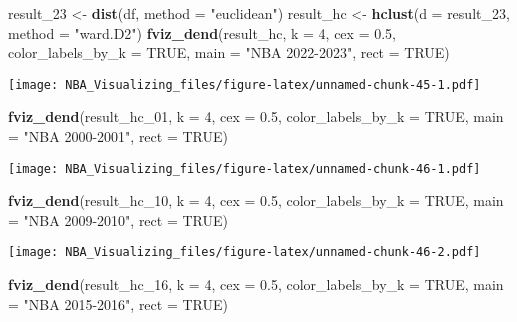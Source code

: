 \documentclass[
]{book}
\newenvironment{Shaded}{\begin{snugshade}}{\end{snugshade}}
\newcommand{\AttributeTok}[1]{\textcolor[rgb]{0.13,0.29,0.53}{#1}}
\newcommand{\ConstantTok}[1]{\textcolor[rgb]{0.56,0.35,0.01}{#1}}
\newcommand{\DecValTok}[1]{\textcolor[rgb]{0.00,0.00,0.81}{#1}}
\newcommand{\FloatTok}[1]{\textcolor[rgb]{0.00,0.00,0.81}{#1}}
\newcommand{\FunctionTok}[1]{\textcolor[rgb]{0.13,0.29,0.53}{\textbf{#1}}}
\newcommand{\NormalTok}[1]{#1}
\newcommand{\OtherTok}[1]{\textcolor[rgb]{0.56,0.35,0.01}{#1}}
\newcommand{\StringTok}[1]{\textcolor[rgb]{0.31,0.60,0.02}{#1}}
\begin{document}
\begin{Shaded}
\begin{Highlighting}[]
\NormalTok{result\_23 }\OtherTok{\textless{}{-}} \FunctionTok{dist}\NormalTok{(df,}
    \AttributeTok{method =} \StringTok{"euclidean"}\NormalTok{)}
\NormalTok{result\_hc }\OtherTok{\textless{}{-}} \FunctionTok{hclust}\NormalTok{(}\AttributeTok{d =}\NormalTok{ result\_23,}
    \AttributeTok{method =} \StringTok{"ward.D2"}\NormalTok{)}
\FunctionTok{fviz\_dend}\NormalTok{(result\_hc,}
    \AttributeTok{k =} \DecValTok{4}\NormalTok{, }\AttributeTok{cex =} \FloatTok{0.5}\NormalTok{,}
    \AttributeTok{color\_labels\_by\_k =} \ConstantTok{TRUE}\NormalTok{,}
    \AttributeTok{main =} \StringTok{"NBA 2022{-}2023"}\NormalTok{,}
    \AttributeTok{rect =} \ConstantTok{TRUE}\NormalTok{)}
\end{Highlighting}
\end{Shaded}

\texttt{[image: NBA\_Visualizing\_files/figure-latex/unnamed-chunk-45-1.pdf]}

\begin{Shaded}
\begin{Highlighting}[]
\FunctionTok{fviz\_dend}\NormalTok{(result\_hc\_01,}
    \AttributeTok{k =} \DecValTok{4}\NormalTok{, }\AttributeTok{cex =} \FloatTok{0.5}\NormalTok{,}
    \AttributeTok{color\_labels\_by\_k =} \ConstantTok{TRUE}\NormalTok{,}
    \AttributeTok{main =} \StringTok{"NBA 2000{-}2001"}\NormalTok{,}
    \AttributeTok{rect =} \ConstantTok{TRUE}\NormalTok{)}
\end{Highlighting}
\end{Shaded}

\texttt{[image: NBA\_Visualizing\_files/figure-latex/unnamed-chunk-46-1.pdf]}

\begin{Shaded}
\begin{Highlighting}[]
\FunctionTok{fviz\_dend}\NormalTok{(result\_hc\_10,}
    \AttributeTok{k =} \DecValTok{4}\NormalTok{, }\AttributeTok{cex =} \FloatTok{0.5}\NormalTok{,}
    \AttributeTok{color\_labels\_by\_k =} \ConstantTok{TRUE}\NormalTok{,}
    \AttributeTok{main =} \StringTok{"NBA 2009{-}2010"}\NormalTok{,}
    \AttributeTok{rect =} \ConstantTok{TRUE}\NormalTok{)}
\end{Highlighting}
\end{Shaded}

\texttt{[image: NBA\_Visualizing\_files/figure-latex/unnamed-chunk-46-2.pdf]}

\begin{Shaded}
\begin{Highlighting}[]
\FunctionTok{fviz\_dend}\NormalTok{(result\_hc\_16,}
    \AttributeTok{k =} \DecValTok{4}\NormalTok{, }\AttributeTok{cex =} \FloatTok{0.5}\NormalTok{,}
    \AttributeTok{color\_labels\_by\_k =} \ConstantTok{TRUE}\NormalTok{,}
    \AttributeTok{main =} \StringTok{"NBA 2015{-}2016"}\NormalTok{,}
    \AttributeTok{rect =} \ConstantTok{TRUE}\NormalTok{)}
\end{Highlighting}
\end{Shaded}
\end{document}
